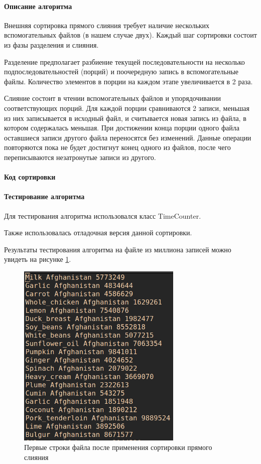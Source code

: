 \documentclass[a4paper, 14pt]{extarticle}
\begin{document}
\paragraph{Описание алгоритма}
Внешняя сортировка прямого слияния требует наличие нескольких
вспомогательных файлов (в нашем случае двух).
Каждый шаг сортировки состоит из фазы разделения
и слияния.

Разделение предполагает разбиение текущей последовательности на
несколько подпоследовательностей (порций) и поочередную запись в вспомогательные
файлы. Количество элементов в порции на каждом этапе увеличивается в 2
раза.

Слияние состоит в чтении вспомогательных файлов и упорядочивании
соответствующих порций. Для каждой порции сравниваются 2 записи, меньшая
из них записывается в исходный файл, и считывается новая запись из файла, в
котором содержалась меньшая. При достижении конца порции одного файла
оставшиеся записи другого файла переносятся без изменений. Данные
операции повторяются пока не будет достигнут конец одного из файлов, после чего
переписываются незатронутые записи из другого.
\paragraph{Код сортировки}

\paragraph{Тестирование алгоритма}
Для тестирования алгоритма использовался класс TimeCounter.

Также использовалась отладочная версия данной сортировки.

Результаты тестирования алгоритма на файле из миллиона записей можно
увидеть на рисунке \ref{fig:first_sort_test}.
\begin{figure}[htpb]
  \centering
  \includegraphics[width=0.7\textwidth]{pictures/first_sort_test.png}
  \caption{Первые строки файла после применения сортировки прямого слияния}
  \label{fig:first_sort_test}
\end{figure}
\end{document}

